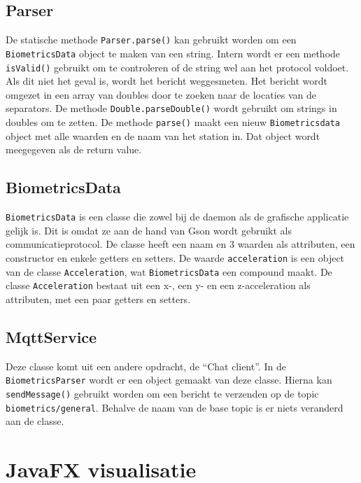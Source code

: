 \documentclass[a4paper]{report}
\newcommand{\code}[1]{\colorbox{light-gray}{\texttt{#1}}}
\begin{document}
        \subsection{Parser} 
            De statische methode \code{Parser.parse()} kan gebruikt worden om een \linebreak\code{BiometricsData} object te maken van een string.
            Intern wordt er een methode \code{isValid()} gebruikt om te controleren of de string wel aan het protocol voldoet.
            Als dit niet het geval is, wordt het bericht weggesmeten.
            Het bericht wordt omgezet in een array van doubles door te zoeken naar de locaties van de separators.
            De methode \code{Double.parseDouble()} wordt gebruikt om strings in doubles om te zetten.
            De methode \code{parse()} maakt een nieuw \code{Biometricsdata} object met alle waarden en de naam van het station in.
            Dat object wordt meegegeven als de return value.

        \subsection{BiometricsData}
        \label{sec:biometricdata}
            \code{BiometricsData} is een classe die zowel bij de daemon als de grafische applicatie gelijk is.
            Dit is omdat ze aan de hand van Gson wordt gebruikt als communicatieprotocol.
            De classe heeft een naam en 3 waarden als attributen, een constructor en enkele getters en setters.
            De waarde \code{acceleration} is een object van de classe \code{Acceleration}, wat \code{BiometricsData} een compound maakt.
            De classe \code{Acceleration} bestaat uit een x-, een y- en een z-acceleration als attributen, met een paar getters en setters.

        \subsection{MqttService}
        \label{sec:mqttservice}
            Deze classe komt uit een andere opdracht, de ``Chat client''.
            In de \linebreak\code{BiometricsParser} wordt er een object gemaakt van deze classe.
            Hierna kan \code{sendMessage()} gebruikt worden om een bericht te verzenden op de topic \code{biometrics/general}.
            Behalve de naam van de base topic is er niets veranderd aan de classe.

    \section{JavaFX visualisatie}
\end{document}
